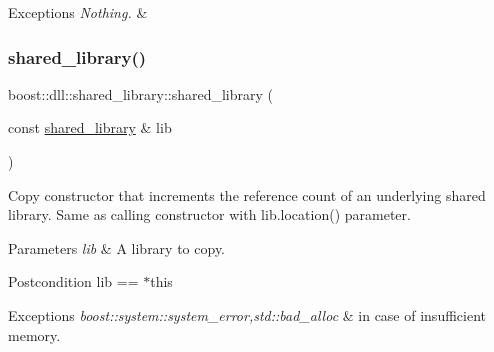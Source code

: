 \begin{DoxyExceptions}{Exceptions}
{\em Nothing.} & \\
\hline
\end{DoxyExceptions}
\mbox{\label{a01708_a89eee45a2a309e7f4cfaba95873f30f8}} 
\subsubsection{\texorpdfstring{shared\+\_\+library()}{shared\_library()}\hspace{0.1cm}{\footnotesize\ttfamily [2/7]}}
{\footnotesize\ttfamily boost\+::dll\+::shared\+\_\+library\+::shared\+\_\+library (\begin{DoxyParamCaption}\item[{const \hyperlink{a01708}{shared\+\_\+library} \&}]{lib }\end{DoxyParamCaption})\hspace{0.3cm}{\ttfamily [inline]}}

Copy constructor that increments the reference count of an underlying shared library. Same as calling constructor with {\ttfamily lib.\+location()} parameter.


\begin{DoxyParams}{Parameters}
{\em lib} & A library to copy. \\
\hline
\end{DoxyParams}
\begin{DoxyPostcond}{Postcondition}
lib == $\ast$this 
\end{DoxyPostcond}

\begin{DoxyExceptions}{Exceptions}
{\em boost\+::system\+::system\+\_\+error,std\+::bad\+\_\+alloc} & in case of insufficient memory. \\
\hline
\end{DoxyExceptions}
\mbox{\label{a01708_a27f628687eb5d0a47d47f981d429ac33}} 
